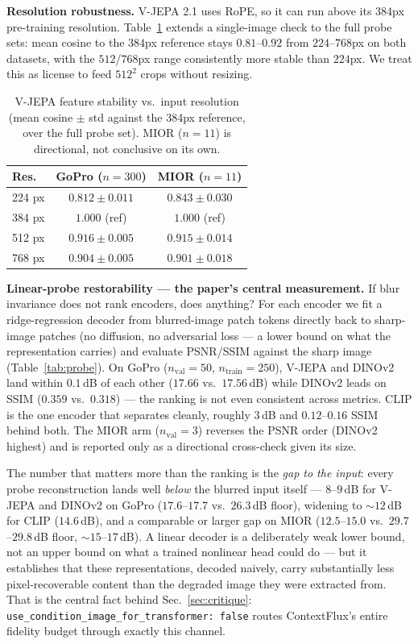 \documentclass{article}
\begin{document}
\textbf{Resolution robustness.} V-JEPA 2.1 uses RoPE, so it can run above its $384$px pre-training resolution. Table~\ref{tab:resolution} extends a single-image check to the full probe sets: mean cosine to the $384$px reference stays $0.81$--$0.92$ from $224$--$768$px on both datasets, with the $512$/$768$px range consistently more stable than $224$px. We treat this as license to feed $512^2$ crops without resizing.

\begin{table}[t]
\centering
\caption{V-JEPA feature stability vs.\ input resolution (mean cosine $\pm$ std against the 384px reference, over the full probe set). MIOR ($n{=}11$) is directional, not conclusive on its own.}
\label{tab:resolution}
\small
\setlength\tabcolsep{4pt}
\begin{tabular}{lcc}
\toprule
Res. & GoPro ($n{=}300$) & MIOR ($n{=}11$) \\
\midrule
224 px & $0.812 \pm 0.011$ & $0.843 \pm 0.030$ \\
384 px & $1.000$ (ref)      & $1.000$ (ref)      \\
512 px & $0.916 \pm 0.005$ & $0.915 \pm 0.014$ \\
768 px & $0.904 \pm 0.005$ & $0.901 \pm 0.018$ \\
\bottomrule
\end{tabular}
\end{table}

\textbf{Linear-probe restorability — the paper's central measurement.} If blur invariance does not rank encoders, does anything? For each encoder we fit a ridge-regression decoder from blurred-image patch tokens directly back to sharp-image patches (no diffusion, no adversarial loss — a lower bound on what the representation carries) and evaluate PSNR/SSIM against the sharp image (Table~\ref{tab:probe}). On GoPro ($n_{\mathrm{val}}{=}50$, $n_{\mathrm{train}}{=}250$), V-JEPA and DINOv2 land within $0.1$\,dB of each other ($17.66$ vs.\ $17.56$\,dB) while DINOv2 leads on SSIM ($0.359$ vs.\ $0.318$) — the ranking is not even consistent across metrics. CLIP is the one encoder that separates cleanly, roughly $3$\,dB and $0.12$--$0.16$ SSIM behind both. The MIOR arm ($n_{\mathrm{val}}{=}3$) reverses the PSNR order (DINOv2 highest) and is reported only as a directional cross-check given its size.

The number that matters more than the ranking is the \emph{gap to the input}: every probe reconstruction lands well \emph{below} the blurred input itself — $8$--$9$\,dB for V-JEPA and DINOv2 on GoPro ($17.6$--$17.7$ vs.\ $26.3$\,dB floor), widening to $\sim\!12$\,dB for CLIP ($14.6$\,dB), and a comparable or larger gap on MIOR ($12.5$--$15.0$ vs.\ $29.7$--$29.8$\,dB floor, $\sim\!15$--$17$\,dB). A linear decoder is a deliberately weak lower bound, not an upper bound on what a trained nonlinear head could do — but it establishes that these representations, decoded naively, carry substantially less pixel-recoverable content than the degraded image they were extracted from. That is the central fact behind Sec.~\ref{sec:critique}: \texttt{use\_condition\_image\_for\_transformer: false} routes ContextFlux's entire fidelity budget through exactly this channel.
\end{document}

